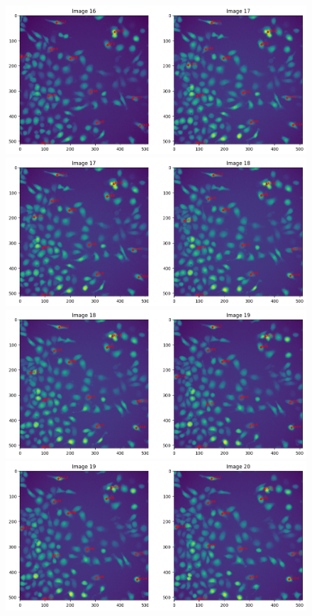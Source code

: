 \documentclass{article}
\begin{document}
\begin{figure}[h!]
\centering
\includegraphics[width=0.75\linewidth]{Report/RImages/Traces_Control/image_17a.png}
\includegraphics[width=0.75\linewidth]{Report/RImages/Traces_Control/image_18a.png}
\includegraphics[width=0.75\linewidth]{Report/RImages/Traces_Control/image_19a.png}
\includegraphics[width=0.75\linewidth]{Report/RImages/Traces_Control/image_20a.png}
\end{figure}

\clearpage
\end{document}
